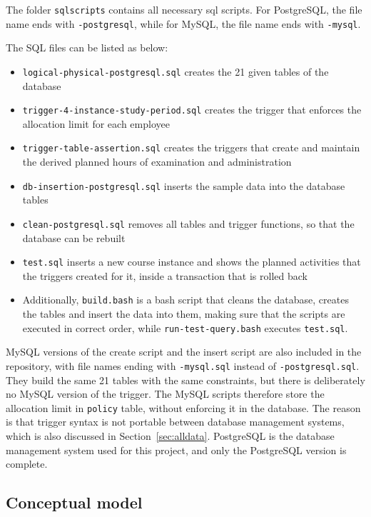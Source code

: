 \documentclass[a4paper]{scrartcl}
\renewcommand{\_}{\textunderscore\allowbreak}
\begin{document}
The folder \texttt{sql\_scripts} contains all necessary sql scripts. For PostgreSQL, the file name ends with \texttt{-postgresql}, while for MySQL, the file name ends with \texttt{-mysql}.

The SQL files can be listed as below:
\begin{itemize}
  \item \texttt{logical-physical-postgresql.sql} creates the 21 given tables of the database
  \item \texttt{trigger-4-instance-study-period.sql} creates the trigger that enforces the allocation limit for each employee
  \item \texttt{trigger-table-assertion.sql} creates the triggers that create and maintain the derived planned hours of examination and administration
  \item \texttt{db-insertion-postgresql.sql} inserts the sample data into the database tables
  \item \texttt{clean-postgresql.sql} removes all tables and trigger functions, so that the database can be rebuilt
  \item \texttt{test.sql} inserts a new course instance and shows the planned activities that the triggers created for it, inside a transaction that is rolled back
  \item Additionally, \texttt{build.bash} is a bash script that cleans the database, creates the tables and insert the data into them, making sure that the scripts are executed in correct order, while \texttt{run-test-query.bash} executes \texttt{test.sql}.
\end{itemize}

MySQL versions of the create script and the insert script are also included in the repository, with file names ending with \texttt{-mysql.sql} instead of \texttt{-postgresql.sql}. They build the same 21 tables with the same constraints, but there is deliberately no MySQL version of the trigger. The MySQL scripts therefore store the allocation limit in \texttt{policy} table, without enforcing it in the database. The reason is that trigger syntax is not portable between database management systems, which is also discussed in Section~\ref{sec:alldata}. PostgreSQL is the database management system used for this project, and only the PostgreSQL version is complete.

\subsection{Conceptual model}
\end{document}
